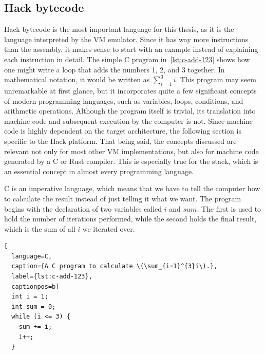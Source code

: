 \subsection{Hack bytecode}
\label{hack-bytecode}
Hack bytecode is the most important language for this thesis, as it is the language interpreted by the VM emulator.
Since it has way more instructions than the assembly, it makes sense to start with an example instead of explaining each instruction in detail.
The simple C program in~\cref{lst:c-add-123} shows how one might write a loop that adds the numbers 1, 2, and 3 together.
In mathematical notation, it would be written as \(\sum_{i=1}^{3}i\).
This program may seem unremarkable at first glance, but it incorporates quite a few significant concepts of modern programming languages, such as variables, loops, conditions, and arithmetic operations.
Although the program itself is trivial, its translation into machine code and subsequent execution by the computer is not.
Since machine code is highly dependent on the target architecture, the following section is specific to the Hack platform. That being said, the concepts discussed are relevant not only for most other VM implementations, but also for machine code generated by a C or Rust compiler.
This is especially true for the stack, which is an essential concept in almost every programming language.

C is an imperative language, which means that we have to tell the computer how to calculate the result instead of just telling it what we want.
The program begins with the declaration of two variables called \(i\) and \(sum\).
The first is used to hold the number of iterations performed, while the second holds the final result, which is the sum of all \(i\) we iterated over.

\begin{lstlisting}[
  language=C,
  caption={A C program to calculate \(\sum_{i=1}^{3}i\).},
  label={lst:c-add-123},
  captionpos=b]
  int i = 1;
  int sum = 0;
  while (i <= 3) {
    sum += i;
    i++;
  }
\end{lstlisting}

